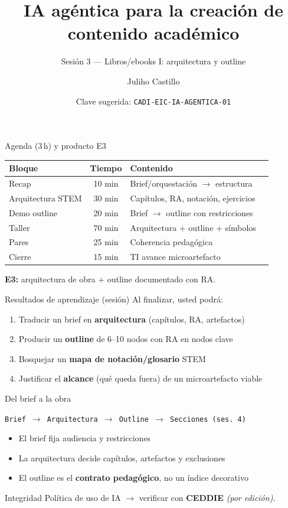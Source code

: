 \documentclass[aspectratio=169,11pt]{beamer}
\title{IA agéntica para la creación de contenido académico}
\subtitle{Sesión 3 --- Libros/ebooks I: arquitectura y outline}
\author{Juliho Castillo}
\institute{CADi 40\,h · Escuela de Ingeniería y Ciencias\\
Tecnológico de Monterrey}
\date{Clave sugerida: \texttt{CADI-EIC-IA-AGENTICA-01}}
\begin{document}
\begin{frame}
\titlepage
\end{frame}

\begin{frame}{Agenda (3\,h) y producto E3}
\begin{tabularx}{\textwidth}{@{}lclX@{}}
\toprule
Bloque & Tiempo & Contenido \\
\midrule
Recap & 10 min & Brief/orquestación $\rightarrow$ estructura \\
Arquitectura STEM & 30 min & Capítulos, RA, notación, ejercicios \\
Demo outline & 20 min & Brief $\rightarrow$ outline con restricciones \\
Taller & 70 min & Arquitectura + outline + símbolos \\
Pares & 25 min & Coherencia pedagógica \\
Cierre & 15 min & TI avance microartefacto \\
\bottomrule
\end{tabularx}
\vspace{0.5em}
\textbf{E3:} arquitectura de obra + outline documentado con RA.
\end{frame}

\begin{frame}{Resultados de aprendizaje (sesión)}
Al finalizar, usted podrá:
\begin{enumerate}
\item Traducir un brief en \textbf{arquitectura} (capítulos, RA, artefactos)
\item Producir un \textbf{outline} de 6--10 nodos con RA en nodos clave
\item Bosquejar un \textbf{mapa de notación/glosario} STEM
\item Justificar el \textbf{alcance} (qué queda fuera) de un microartefacto viable
\end{enumerate}
\end{frame}

\begin{frame}{Del brief a la obra}
\begin{center}
\texttt{Brief $\rightarrow$ Arquitectura $\rightarrow$ Outline $\rightarrow$ Secciones (ses.\ 4)}
\end{center}
\begin{itemize}
\item El brief fija audiencia y restricciones
\item La arquitectura decide capítulos, artefactos y exclusiones
\item El outline es el \textbf{contrato pedagógico}, no un índice decorativo
\end{itemize}
\begin{block}{Integridad}
Política de uso de IA $\rightarrow$ verificar con \textbf{CEDDIE} \emph{(por edición)}.
\end{block}
\end{frame}
\end{document}
